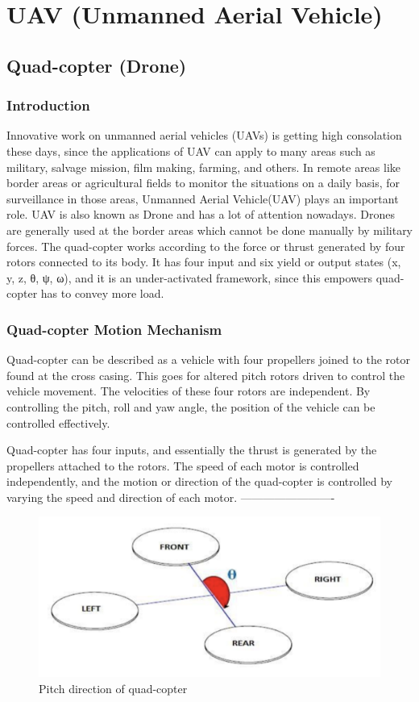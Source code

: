 \documentclass[a4paper,twoside]{iiththesis}
\begin{document}
%



\chapter{UAV (Unmanned Aerial Vehicle)}
\section{Quad-copter (Drone)}
\subsection{Introduction} 
\par  Innovative work on unmanned aerial vehicles (UAVs) is getting high consolation these days, since the applications of UAV can apply to many areas such as military, salvage mission, film making, farming, and others.
In remote areas like border areas or agricultural fields to monitor the situations on a daily basis, for surveillance in those areas, Unmanned Aerial Vehicle(UAV) plays an important role. UAV is also known as Drone and has a lot of attention nowadays. Drones are generally used at the border areas which cannot be done manually by military forces.
The quad-copter works according to the force or thrust generated by four rotors connected to its body. It has four input and six yield or output states (x, y, z, θ, ψ, ω), and it is an under-activated framework, since this empowers quad-copter has to convey more load.
\subsection{Quad-copter Motion Mechanism}
\par Quad-copter can be described as a vehicle with four propellers joined to the rotor found at the cross casing. This goes for altered pitch rotors driven to control the vehicle movement. The velocities of these four rotors are independent. By controlling the pitch, roll and yaw angle, the position of the vehicle can be controlled effectively.
\par Quad-copter has four inputs, and essentially the thrust is generated by the propellers attached to the rotors. The speed of each motor is controlled independently, and the motion or direction of the quad-copter is controlled by varying the speed and direction of each motor.
-------------------------
\begin{figure}[h!]
\caption{Pitch direction of quad-copter}
\label{Pitch direction of quadcopter}
\centering
\includegraphics[width=\columnwidth]{./Figures/pitch_direction.png}
\end{figure}
\end{document}
